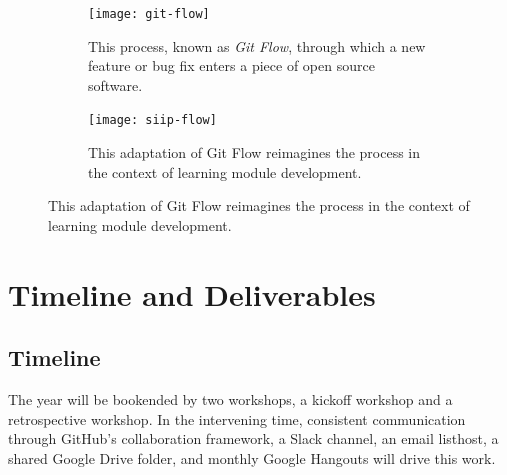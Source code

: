 \documentclass[11pt]{article}
\begin{document}
          \begin{figure}
                  \centering
                  \begin{subfigure}{.4\textwidth}
                            \centering
                            \texttt{[image: git-flow]}
          \caption{This process, known as \emph{Git Flow}, through which a new 
                          feature or bug fix enters a piece of open source 
                          software\cite{scopatz_effective_2015}.}
                                  \label{fig:sub1}
                  \end{subfigure}\hfill%
                  \begin{subfigure}{.4\textwidth}
                            \centering
                            \texttt{[image: siip-flow]}
          \caption{This adaptation of Git Flow reimagines the process in the context of learning module development.}
                                  \label{fig:sub2}
                  \end{subfigure}
                  \label{fig:test}
          \end{figure}
          \FloatBarrier

          \section{Timeline and Deliverables}
          \subsection{Timeline}
          The year will be bookended by two workshops, a kickoff workshop 
          and a retrospective workshop. In the intervening time, consistent 
          communication through GitHub's collaboration framework, a Slack 
          channel, an email listhost, a shared Google Drive folder, and monthly 
          Google Hangouts will drive this work.
\end{document}
